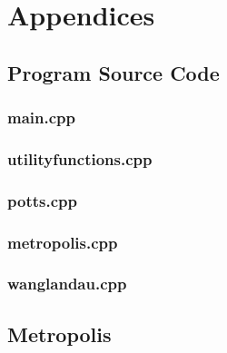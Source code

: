 \chapter{Appendices}
\section{Program Source Code}
\subsection{main.cpp}


\subsection{utilityfunctions.cpp}


\subsection{potts.cpp}


\subsection{metropolis.cpp}


\subsection{wanglandau.cpp}



\section{Metropolis}
